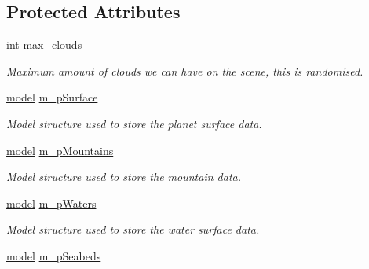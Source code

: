 \subsection*{Protected Attributes}
\begin{DoxyCompactItemize}
\item 
\hypertarget{classPlanet_afb186049b5eae6b99a74cbf60dc9e70f}{
int \hyperlink{classPlanet_afb186049b5eae6b99a74cbf60dc9e70f}{max\_\-clouds}}
\label{classPlanet_afb186049b5eae6b99a74cbf60dc9e70f}

\begin{DoxyCompactList}\small\item\em Maximum amount of clouds we can have on the scene, this is randomised. \item\end{DoxyCompactList}\item 
\hypertarget{classPlanet_a1d388c9826a2189f5799ba6cb4dc38eb}{
\hyperlink{structmodel}{model} \hyperlink{classPlanet_a1d388c9826a2189f5799ba6cb4dc38eb}{m\_\-pSurface}}
\label{classPlanet_a1d388c9826a2189f5799ba6cb4dc38eb}

\begin{DoxyCompactList}\small\item\em Model structure used to store the planet surface data. \item\end{DoxyCompactList}\item 
\hypertarget{classPlanet_adb4453e2574c20fc967204ad23cc0c67}{
\hyperlink{structmodel}{model} \hyperlink{classPlanet_adb4453e2574c20fc967204ad23cc0c67}{m\_\-pMountains}}
\label{classPlanet_adb4453e2574c20fc967204ad23cc0c67}

\begin{DoxyCompactList}\small\item\em Model structure used to store the mountain data. \item\end{DoxyCompactList}\item 
\hypertarget{classPlanet_a737de75291cdff5e7fd56929c2f439b7}{
\hyperlink{structmodel}{model} \hyperlink{classPlanet_a737de75291cdff5e7fd56929c2f439b7}{m\_\-pWaters}}
\label{classPlanet_a737de75291cdff5e7fd56929c2f439b7}

\begin{DoxyCompactList}\small\item\em Model structure used to store the water surface data. \item\end{DoxyCompactList}\item 
\hypertarget{classPlanet_aa3fa2fff1b882241a76394a6813b81aa}{
\hyperlink{structmodel}{model} \hyperlink{classPlanet_aa3fa2fff1b882241a76394a6813b81aa}{m\_\-pSeabeds}}
\label{classPlanet_aa3fa2fff1b882241a76394a6813b81aa}


\end{DoxyCompactItemize}
